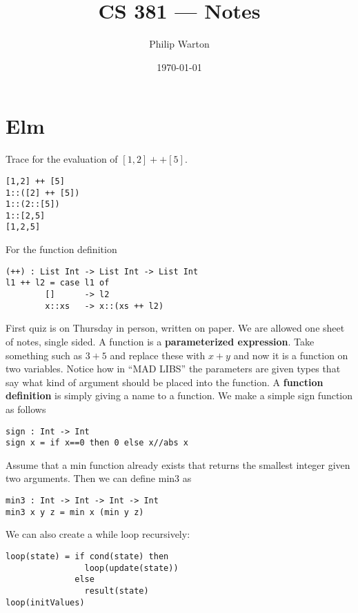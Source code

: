 \documentclass{article}
\theoremstyle{definition}
\begin{document}
\title{CS 381 --- Notes}
\author{Philip Warton}
\date{\today}
\maketitle
\section{Elm}
Trace for the evaluation of $[1,2] ++ [5]$.
\begin{mdframed}
    \begin{verbatim}
[1,2] ++ [5]
1::([2] ++ [5])
1::(2::[5])
1::[2,5]
[1,2,5]
        \end{verbatim}
\end{mdframed}
For the function definition
\begin{mdframed}[]
    \begin{verbatim}
(++) : List Int -> List Int -> List Int
l1 ++ l2 = case l1 of
        []      -> l2
        x::xs   -> x::(xs ++ l2)
    \end{verbatim}
\end{mdframed}
First quiz is on Thursday in person, written on paper. We are allowed one sheet of notes, single sided.
A function is a \textbf{parameterized expression}. Take something such as $3 + 5$ and replace these with
$x + y$ and now it is a function on two variables. Notice how in ``MAD LIBS'' the parameters are given types
that say what kind of argument should be placed into the function.
A \textbf{function definition} is simply giving a name to a function.
We make a simple sign function as follows
\begin{mdframed}[]
    \begin{verbatim}
sign : Int -> Int
sign x = if x==0 then 0 else x//abs x
    \end{verbatim}
\end{mdframed}
Assume that a min function already exists that returns the smallest integer given two arguments. Then we can define 
min3 as 
\begin{mdframed}[]
    \begin{verbatim}
min3 : Int -> Int -> Int -> Int
min3 x y z = min x (min y z)
    \end{verbatim}
\end{mdframed}
We can also create a while loop recursively:
\begin{mdframed}[]
    \begin{verbatim}
loop(state) = if cond(state) then
                loop(update(state))
              else
                result(state)
loop(initValues)
    \end{verbatim}
\end{mdframed}
\end{document}
